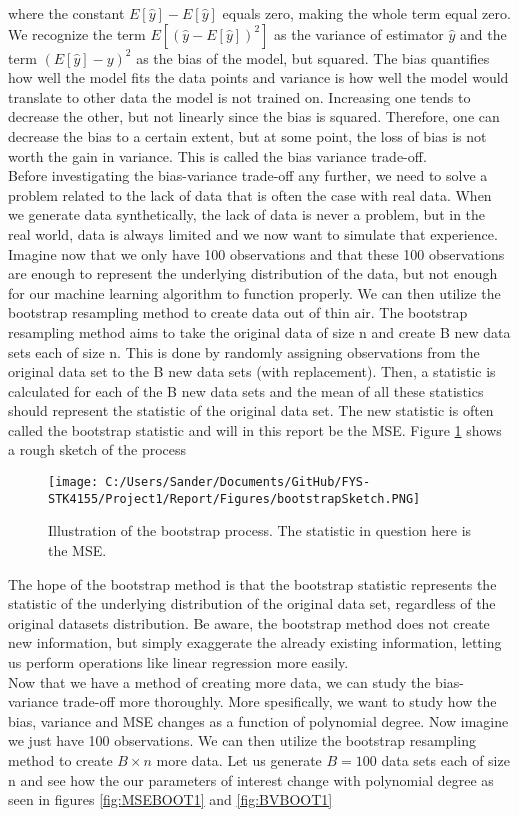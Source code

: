 \documentclass[12pt,a4paper]{article}
\begin{document}
where the constant $E[\hat{y}] - E[\hat{y}]$ equals zero, making the whole term equal zero. 
\\
We recognize the term $E[(\hat{y} - E[\hat{y}])^2]$ as the variance of estimator $\hat{y}$ and the term $(E[\hat{y}]-y)^2$ as the bias of the model, but squared. The bias quantifies how well the model fits the data points and variance is how well the model would translate to other data the model is not trained on. Increasing one tends to decrease the other, but not linearly since the bias is squared. Therefore, one can decrease the bias to a certain extent, but at some point, the loss of bias is not worth the gain in variance. This is called the bias variance trade-off. 
\\
Before investigating the bias-variance trade-off any further, we need to solve a problem related to the lack of data that is often the case with real data. When we generate data synthetically, the lack of data is never a problem, but in the real world, data is always limited and we now want to simulate that experience. Imagine now that we only have 100 observations and that these 100 observations are enough to represent the underlying distribution of the data, but not enough for our machine learning algorithm to function properly. We can then utilize the bootstrap resampling method to create data out of thin air. The bootstrap resampling method aims to take the original data of size n and create B new data sets each of size n. This is done by randomly assigning observations from the original data set to the B new data sets (with replacement). Then, a statistic is calculated for each of the B new data sets and the mean of all these statistics should represent the statistic of the original data set. The new statistic is often called the bootstrap statistic and will in this report be the MSE. Figure \ref{fig:Bootsketch} shows a rough sketch of the process

\begin{figure}[H]
\centering
\texttt{[image: C:/Users/Sander/Documents/GitHub/FYS-STK4155/Project1/Report/Figures/bootstrapSketch.PNG]}
\caption{\label{fig:Bootsketch} Illustration of the bootstrap process. The statistic in question here is the MSE.}
\end{figure}

\noindent The hope of the bootstrap method is that the bootstrap statistic represents the statistic of the underlying distribution of the original data set, regardless of the original datasets distribution. Be aware, the bootstrap method does not create new information, but simply exaggerate the already existing information, letting us perform operations like linear regression more easily.
\\
Now that we have a method of creating more data, we can study the bias-variance trade-off more thoroughly. More spesifically, we want to study how the bias, variance and MSE changes as a function of polynomial degree. Now imagine we just have 100 observations. We can then utilize the bootstrap resampling method to create $B \times n$ more data. Let us generate $B = 100$ data sets each of size n and see how the our parameters of interest change with polynomial degree as seen in figures \ref{fig:MSEBOOT1} and \ref{fig:BVBOOT1}
\end{document}
